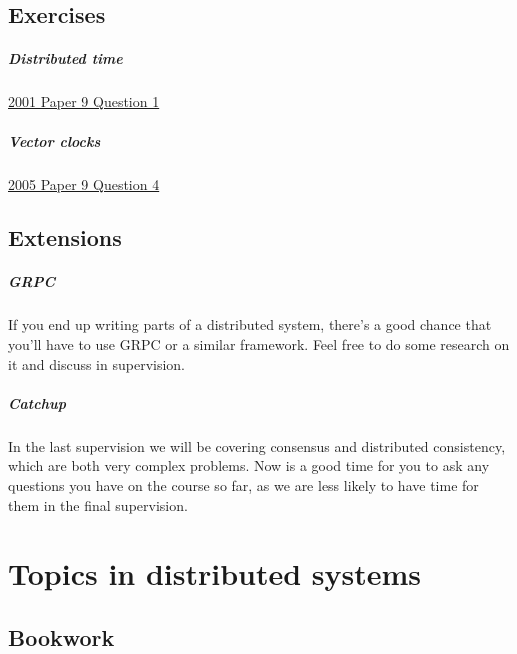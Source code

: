 \documentclass[12pt,a4paper,oneside,openright]{report}
\newcommand{\question}[2]{\paragraph{#1} #2}
\begin{document}
\section{Exercises}

\question{Distributed
  time}{\href{https://www.cl.cam.ac.uk/teaching/exams/pastpapers/y2001p9q1.pdf}{2001
    Paper 9 Question 1}}

\question{Vector
  clocks}{\href{https://www.cl.cam.ac.uk/teaching/exams/pastpapers/y2005p9q4.pdf}{2005
    Paper 9 Question 4}}


\section{Extensions}

\question{GRPC}{If you end up writing parts of a distributed system,
  there's a good chance that you'll have to use GRPC or a similar
  framework. Feel free to do some research on it and discuss in
  supervision.}

\question{Catchup}{In the last supervision we will be covering
  consensus and distributed consistency, which are both very complex
  problems. Now is a good time for you to ask any questions you have
  on the course so far, as we are less likely to have time for them in
  the final supervision.}


\chapter{Topics in distributed systems}

\section{Bookwork}
\end{document}
